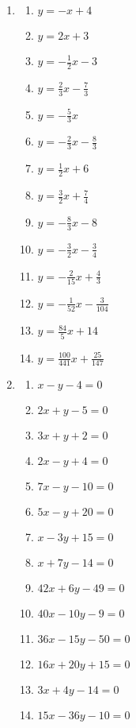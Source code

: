 \documentclass[a4paper,12pt]{article}
\begin{document}
\begin{enumerate}
\item
    \begin{multicols}{2}
    \begin{enumerate}
    \item $y = -x + 4$
    \item $y = 2x + 3$
    \item $y = -\frac{1}{2}x - 3$
    \item $y = \frac{2}{3}x - \frac{7}{3}$
    \item $y = -\frac{5}{3}x$
    \item $y = -\frac{2}{3}x - \frac{8}{3}$
    \item $y = \frac{1}{2}x + 6$
    \item $y = \frac{3}{2}x + \frac{7}{4}$
    \item $y = -\frac{8}{3}x - 8$
    \item $y = -\frac{3}{2}x - \frac{3}{4}$
    \item $y = -\frac{2}{15}x + \frac{4}{3}$
    \item $y = -\frac{1}{52}x - \frac{3}{104}$
    \item $y = \frac{84}{5}x + 14$
    \item $y = \frac{100}{441}x + \frac{25}{147}$
    \end{enumerate}
    \end{multicols}

\item
    \begin{multicols}{2}
    \begin{enumerate}
    \item $x - y - 4 = 0$
    \item $2x + y - 5 = 0$
    \item $3x + y + 2 = 0$
    \item $2x - y + 4 = 0$
    \item $7x - y - 10 = 0$
    \item $5x - y + 20 = 0$
    \item $x - 3y + 15 = 0$
    \item $x + 7y - 14 = 0$
    \item $42x + 6y - 49 = 0$
    \item $40x - 10y - 9 = 0$
    \item $36x - 15y - 50 = 0$
    \item $16x + 20y + 15 = 0$
    \item $3x + 4y - 14 = 0$
    \item $15x - 36y - 10 = 0 $
    \end{enumerate}
    \end{multicols}

\end{enumerate}
\end{document}
